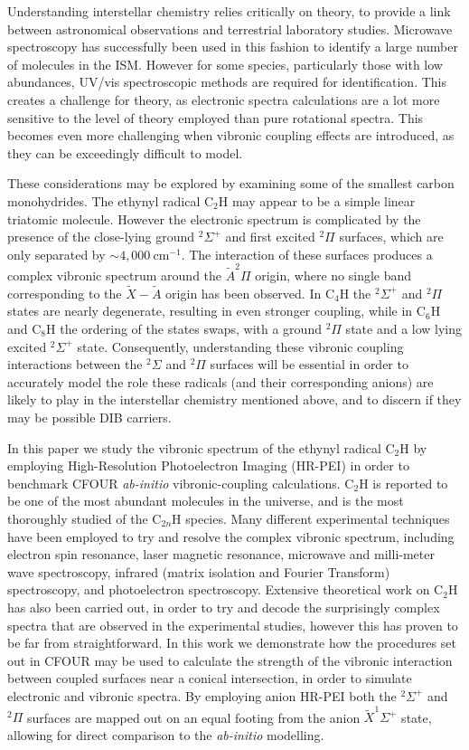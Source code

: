 \documentclass[journal=jpcafh,manuscript=article,layout=onecolumn, 12pt]{achemso}
\begin{document}
Understanding interstellar chemistry relies critically on theory, to provide a link between astronomical observations and terrestrial laboratory studies. Microwave spectroscopy has successfully been used in this fashion to identify a large number of molecules in the ISM. However for some species, particularly those with low abundances, UV/vis spectroscopic methods are required for identification. This creates a challenge for theory, as electronic spectra calculations are a lot more sensitive to the level of theory employed than pure rotational spectra. This becomes even more challenging when vibronic coupling effects are introduced, as they can be exceedingly difficult to model.

These considerations may be explored by examining some of the smallest carbon monohydrides. The ethynyl radical C$_2$H may appear to be a simple linear triatomic molecule. However the electronic spectrum is complicated by the presence of the close-lying ground $^2\Sigma^+$ and first excited $^2\Pi$ surfaces, which are only separated by $\sim4,000~$cm$^{-1}$. The interaction of these surfaces produces a complex vibronic spectrum around the $\tilde{A}^2\Pi$ origin, where no single band corresponding to the $\tilde{X}-\tilde{A}$ origin has been observed. In C$_4$H the $^2\Sigma^+$ and $^2\Pi$ states are nearly degenerate, resulting in even stronger coupling, while in C$_6$H and C$_8$H the ordering of the states swaps, with a ground $^2\Pi$ state and a low lying excited $^2\Sigma^+$ state. Consequently, understanding these vibronic coupling interactions between the $^2\Sigma$ and $^2\Pi$ surfaces will be essential in order to accurately model the role these radicals (and their corresponding anions) are likely to play in the interstellar chemistry mentioned above, and to discern if they may be possible DIB carriers. 

In this paper we study the vibronic spectrum of the ethynyl radical C$_2$H by employing High-Resolution Photoelectron Imaging (HR-PEI) in order to benchmark CFOUR \emph{ab-initio} vibronic-coupling calculations. C$_2$H is reported to be one of the most abundant molecules in the universe, and is the most thoroughly studied of the C$_{2n}$H species. Many different experimental techniques have been employed to try and resolve the complex vibronic spectrum, including electron spin resonance, laser magnetic resonance, microwave and milli-meter wave spectroscopy, infrared (matrix isolation and Fourier Transform) spectroscopy, and photoelectron spectroscopy. Extensive theoretical work on C$_2$H has also been carried out, in order to try and decode the surprisingly complex spectra that are observed in the experimental studies, however this has proven to be far from straightforward. In this work we demonstrate how the procedures set out in CFOUR may be used to calculate the strength of the vibronic interaction between coupled surfaces near a conical intersection, in order to simulate electronic and vibronic spectra. By employing anion HR-PEI both the $^2\Sigma^+$ and $^2\Pi$ surfaces are mapped out on an equal footing from the anion $\tilde{X}^1\Sigma^+$ state, allowing for direct comparison to the \emph{ab-initio} modelling.
\end{document}
